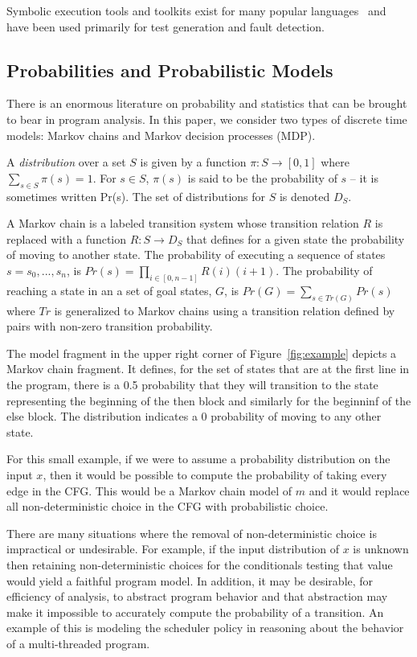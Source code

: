 Symbolic execution tools and toolkits exist for many popular 
languages~\cite{pasareanu2010symbolic,godefroid2005dart,jamrozik2013generating,cadar2008klee}
and have been used primarily for test generation and fault detection.

\subsection{Probabilities and Probabilistic Models}

There is an enormous literature on probability and statistics
that can be brought to bear in program analysis.  
In this paper, we consider two types of discrete time models:
Markov chains and Markov decision processes (MDP).

A \textit{distribution} over a set $S$ is given by a 
function $\pi : S \rightarrow [0,1]$ where
$\sum_{s \in S} \pi(s) = 1$.  For $s \in S$,
$\pi(s)$ is said to be the probability of $s$ -- it is
sometimes written Pr(s).
The set of distributions for $S$ is denoted $D_S$.

A Markov chain is a labeled transition system whose transition
relation $R$ is replaced with a function
$R : S \rightarrow D_S$ that defines for a given state
the probability of moving to another state.
The probability of executing a sequence of states $s = s_0, ..., s_n$, 
is $Pr(s) = \prod_{i \in [0,n-1]} R(i)(i+1)$.
The probability of reaching a state in an 
a set of goal states, $G$, is 
$Pr(G) = \sum_{s \in Tr(G)} Pr(s)$ where $Tr$ is generalized
to Markov chains using a transition relation defined by 
pairs with non-zero transition probability.


The model fragment in the upper right corner of 
Figure~\ref{fig:example} depicts a Markov chain fragment.
It defines, for the set of states 
that are at the first line in the program, 
there is a 0.5 probability that they will transition to 
the state representing the beginning of the then block
and similarly for the beginninf of the else block.  The
distribution indicates a 0 probability of moving to any
other state.

For this small example, if we were to assume a probability
distribution on the input $x$, then it would be possible
to compute the probability of taking every edge in the CFG.   
This would be a Markov chain model of $m$ and it would replace
all non-deterministic choice in the CFG with probabilistic choice.

There are many situations where the removal of non-deterministic
choice is impractical or undesirable.  For example, if the input
distribution of $x$ is unknown then retaining non-deterministic
choices for the conditionals testing that value would yield a
faithful program model.  In addition, it may be desirable, for
efficiency of analysis, to abstract program behavior and that
abstraction may make it impossible to accurately compute the 
probability of a transition.  An example of this is modeling
the scheduler policy in reasoning about the behavior of a multi-threaded
program.

